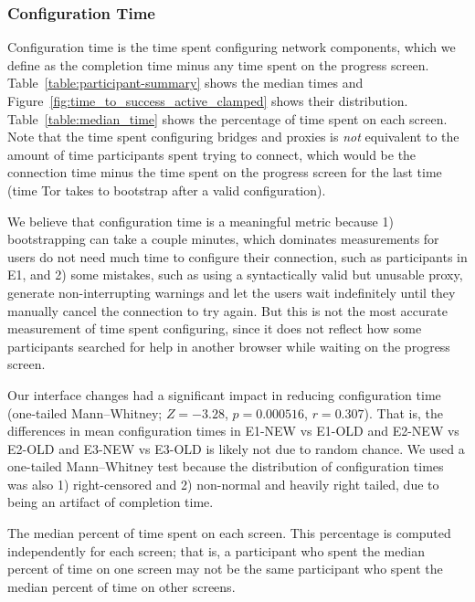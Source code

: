 \documentclass[USenglish,oneside,twocolumn]{article}
\begin{document}
\subsubsection{Configuration Time} 
Configuration time is the time spent configuring network components, which we define as the completion time minus any time spent on the progress screen. Table~\ref{table:participant-summary} shows the median times and Figure~\ref{fig:time_to_success_active_clamped} shows their distribution. Table~\ref{table:median_time} shows the percentage of time spent on each screen. Note that the time spent configuring bridges and proxies is {\it not} equivalent to the amount of time participants spent trying to connect, which would be the connection time minus the time spent on the progress screen for the last time (time Tor takes to bootstrap after a valid configuration). 

We believe that configuration time is a meaningful metric because 1) bootstrapping can take a couple minutes, which dominates measurements for users do not need much time to configure their connection, such as participants in E1, and 2) some mistakes, such as using a syntactically valid but unusable proxy, generate non-interrupting warnings and let the users wait indefinitely until they manually cancel the connection to try again. But this is not the most accurate measurement of time spent configuring, since it does not reflect how some participants searched for help in another browser while waiting on the progress screen.

Our interface changes had a significant impact in reducing configuration time (one-tailed Mann--Whitney; $Z = -3.28$, $p = 0.000516$, $r = 0.307$). That is, the differences in mean configuration times in E1-NEW vs E1-OLD and E2-NEW vs E2-OLD and E3-NEW vs E3-OLD is likely not due to random chance. We used a one-tailed Mann--Whitney test because the distribution of configuration times was also 1) right-censored and 2) non-normal and heavily right tailed, due to being an artifact of completion time. 

\begin{table}[t]
\centering

\caption{
The median percent of time spent on each screen. 
This percentage is computed independently for each screen; that is, a participant who spent the median percent 
of time on one screen may not be the same participant who spent the median percent
of time on other screens.}
\label{table:median_time}
\end{table}
\end{document}
